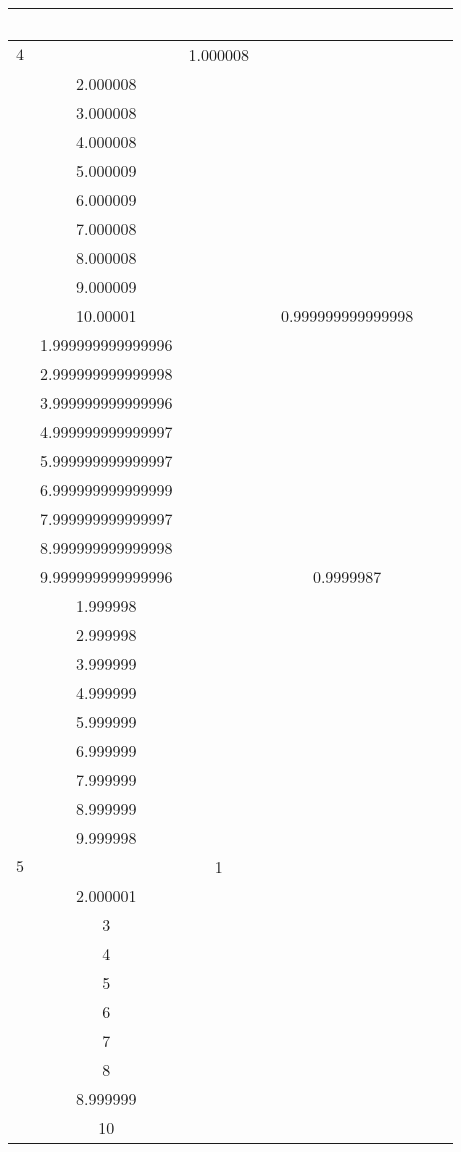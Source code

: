 \documentclass[oneside, final, 12pt]{extarticle}
\begin{document}
\begin{longtable}{|c|c|c|c|c|c|c|}
& ~ 
\\ \hline
\(4\) & \( \begin{aligned}
& 1.000008 \\ & 2.000008 \\ & 3.000008 \\ & 4.000008 \\ & 5.000009 \\ & 6.000009 \\ & 7.000008 \\ & 8.000008 \\ & 9.000009 \\ & 10.00001 
\end{aligned} \)
& ~ 
& \( \begin{aligned}
& 0.999999999999998 \\ & 1.999999999999996 \\ & 2.999999999999998 \\ & 3.999999999999996 \\ & 4.999999999999997 \\ & 5.999999999999997 \\ & 6.999999999999999 \\ & 7.999999999999997 \\ & 8.999999999999998 \\ & 9.999999999999996 
\end{aligned} \)
& ~ 
& \( \begin{aligned}
& 0.9999987 \\ & 1.999998 \\ & 2.999998 \\ & 3.999999 \\ & 4.999999 \\ & 5.999999 \\ & 6.999999 \\ & 7.999999 \\ & 8.999999 \\ & 9.999998 
\end{aligned} \)
& ~ 
\\ \hline
\(5\) & \( \begin{aligned}
& 1 \\ & 2.000001 \\ & 3 \\ & 4 \\ & 5 \\ & 6 \\ & 7 \\ & 8 \\ & 8.999999 \\ & 10 
\end{aligned} \)

\end{longtable}
\end{document}
